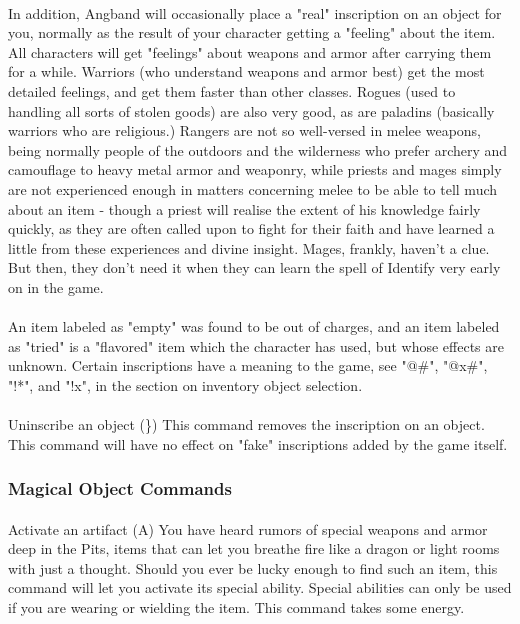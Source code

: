 \paragraph{}In addition, Angband will occasionally place a "real"
inscription on an object for you, normally as the result of your
character getting a "feeling" about the item. All characters will get
"feelings" about weapons and armor after carrying them for a while.
Warriors (who understand weapons and armor best) get the most detailed
feelings, and get them faster than other classes. Rogues (used to
handling all sorts of stolen goods) are also very good, as are paladins
(basically warriors who are religious.) Rangers are not so well-versed
in melee weapons, being normally people of the outdoors and the
wilderness who prefer archery and camouflage to heavy metal armor and
weaponry, while priests and mages simply are not experienced enough in
matters concerning melee to be able to tell much about an item - though
a priest will realise the extent of his knowledge fairly quickly, as
they are often called upon to fight for their faith and have learned a
little from these experiences and divine insight.  Mages, frankly,
haven't a clue. But then, they don't need it when they can learn the
spell of Identify very early on in the game.

\paragraph{}An item labeled as "{empty}" was found to be out of charges,
and an item labeled as "{tried}" is a "flavored" item which the
character has used, but whose effects are unknown. Certain inscriptions
have a meaning to the game, see "@\#", "@x\#", "!*", and "!x", in the
section on inventory object selection.

\paragraph{}Uninscribe an object (\}) This command removes the
inscription on an object. This command will have no effect on "fake"
inscriptions added by the game itself.

\subsubsection{Magical Object Commands} 
\paragraph{}Activate an artifact
(A) You have heard rumors of special weapons and armor deep in the Pits,
items that can let you breathe fire like a dragon or light rooms with
just a thought. Should you ever be lucky enough to find such an item,
this command will let you activate its special ability. Special
abilities can only be used if you are wearing or wielding the item. This
command takes some energy.

